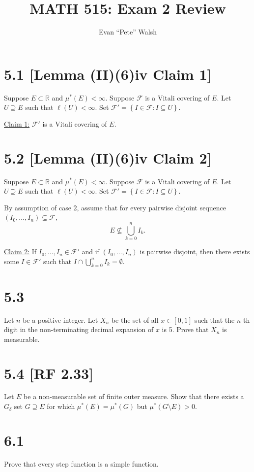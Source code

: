 \documentclass[12pt]{article}
\title{MATH 515: Exam 2 Review}
\author{Evan ``Pete'' Walsh}
\begin{document}


\section*{5.1 [Lemma (II)(6)iv Claim 1]}
Suppose $E\subset \mathbb{R}$ and $\mu^*(E) < \infty$. Suppose $\mathcal{F}$ is a Vitali covering of $E$. Let $U \supseteq E$ such that $\ell(U) <
\infty$. Set $\mathcal{F}' = \left\{ I \in \mathcal{F} : I \subseteq U \right\}$.

\underline{Claim 1:} $\mathcal{F}'$ is a Vitali covering of $E$.

\section*{5.2 [Lemma (II)(6)iv Claim 2]}
Suppose $E\subset \mathbb{R}$ and $\mu^*(E) < \infty$. Suppose $\mathcal{F}$ is a Vitali covering of $E$. Let $U \supseteq E$ such that $\ell(U) <
\infty$. Set $\mathcal{F}' = \left\{ I \in \mathcal{F} : I \subseteq U \right\}$.

By assumption of case 2, assume that for every pairwise disjoint sequence $\left( I_{0}, \hdots, I_{n} \right) \subseteq \mathcal{F}$, 
\[ E \nsubseteq \bigcup_{k=0}^{n}I_{k}.\]

\underline{Claim 2:} If $I_{0}, \hdots, I_{n} \in \mathcal{F}'$ and if $\left( I_{0}, \hdots, I_{n} \right)$ is pairwise disjoint, then there exists
some $I \in \mathcal{F}'$ such that $I \cap \bigcup_{k=0}^{n}I_{k} = \emptyset$.


\section*{5.3}
Let $n$ be a positive integer. Let $X_{n}$ be the set of all $x \in [0,1]$ such that the $n$-th digit in the non-terminating decimal expansion of $x$
is 5. Prove that $X_{n}$ is measurable.


\section*{5.4 [RF 2.33]}
Let $E$ be a non-measurable set of finite outer measure. Show that there exists a $G_{\delta}$ set $G \supseteq E$ for which $\mu^*(E) = \mu^*(G)$ but
$\mu^{*}(G\setminus E) > 0$.


\section*{6.1}
Prove that every step function is a simple function.
\end{document}
